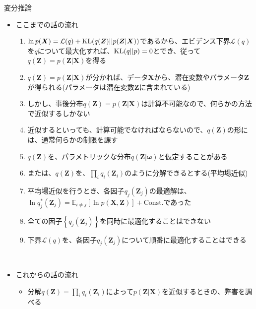 \documentclass[dvipdfmx,notheorems,t]{beamer}
\begin{document}
\begin{frame}{変分推論}

\begin{itemize}
	\item ここまでの話の流れ
	\begin{enumerate}
		\item $\ln p(\bm{X}) = \mathcal{L}(q) + \operatorname{KL} (q(\bm{Z}) || p(\bm{Z} | \bm{X}))$であるから、\alert{エビデンス下界}$\mathcal{L}(q)$を\color{red}$q$について最大化\normalcolor すれば、$\operatorname{KL} (q || p) = 0$とでき、従って$q(\bm{Z}) = p(\bm{Z} | \bm{X})$を得る
		\newline
		\item $q(\bm{Z}) = p(\bm{Z} | \bm{X})$が分かれば、データ$\bm{X}$から、\color{red}潜在変数やパラメータ$\bm{Z}$が得られる\normalcolor (パラメータは潜在変数$\bm{Z}$に含まれている)
		\newline
		\item しかし、事後分布$q(\bm{Z}) = p(\bm{Z} | \bm{X})$は\alert{計算不可能}なので、何らかの方法で\alert{近似}するしかない
		\newline
		\item 近似するといっても、計算可能でなければならないので、$q(\bm{Z})$の形には、通常\alert{何らかの制限}を課す
		\newline
		\item $q(\bm{Z})$を、\alert{パラメトリックな分布}$q(\bm{Z} | \bm{\omega})$と仮定することがある
		\newline
		\item または、$q(\bm{Z})$を、$\prod_i q_i(\bm{Z}_i)$のように分解できるとする(\alert{平均場近似})
		\newline
		\item \alert{平均場近似}を行うとき、各因子$q_j(\bm{Z}_j)$の最適解は、$\ln q_j^*(\bm{Z}_j) = \mathbb{E}_{i \neq j}[\ln p(\bm{X}, \bm{Z})] + \mathrm{Const.}$であった
		\newline
		\item 全ての因子$\left\{ q_j(\bm{Z}_j) \right\}$を\alert{同時に最適化することはできない}
		\newline
		\item 下界$\mathcal{L}(q)$を、各因子$q_j(\bm{Z}_j)$について\alert{順番に最適化}することはできる
	\end{enumerate} \
	
	\item これからの話の流れ
	\begin{itemize}
		\item 分解$q(\bm{Z}) = \prod_i q_i(\bm{Z}_i)$によって$p(\bm{Z} | \bm{X})$を近似するときの、弊害を調べる
	\end{itemize}
\end{itemize}

\end{frame}
\end{document}
